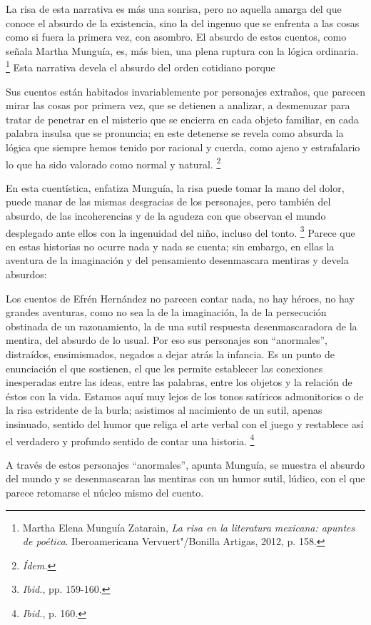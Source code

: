 \documentclass[14pt,twoside,final]{extbook} %
\let\oldfootnote\footnote
\renewcommand\footnote[1]{%
\oldfootnote{\hspace{1mm}#1}}
\begin{document}
La risa de esta narrativa es más una sonrisa, pero no aquella amarga del que conoce el absurdo de la existencia, sino la del ingenuo que se enfrenta a las cosas como si fuera la primera vez, con asombro. El absurdo de estos cuentos, como señala Martha Munguía, es, más bien, una plena ruptura con la lógica ordinaria.\footnote{Martha Elena Munguía Zatarain, \emph{La risa en la literatura mexicana: apuntes de poética}. Iberoamericana Vervuert"/Bonilla Artigas, 2012, p. 158.} Esta narrativa devela el absurdo del orden cotidiano porque
\begin{quoting}
Sus cuentos están habitados invariablemente por personajes extraños, que parecen mirar las cosas por primera vez, que se detienen a analizar, a desmenuzar para tratar de penetrar en el misterio que se encierra en cada objeto familiar, en cada palabra insulsa que se pronuncia; en este detenerse se revela como absurda la lógica que siempre hemos tenido por racional y cuerda, como ajeno y estrafalario lo que ha sido valorado como normal y natural.\footnote{\em Ídem.}
\end{quoting}
En esta cuentística, enfatiza Munguía, la risa puede tomar la mano del dolor, puede manar de las mismas desgracias de los personajes, pero también del absurdo, de las incoherencias y de la agudeza con que observan el mundo desplegado ante ellos con la ingenuidad del niño, incluso del tonto.\footnote{\emph{Ibid.}, pp. 159-160.} Parece que en estas historias no ocurre nada y nada se cuenta; sin embargo, en ellas la aventura de la imaginación y del pensamiento desenmascara mentiras y devela absurdos:
\begin{quoting}
Los cuentos de Efrén Hernández no parecen contar nada, no hay héroes, no hay grandes aventuras, como no sea la de la imaginación, la de la persecución obstinada de un razonamiento, la de una sutil respuesta desenmascaradora de la mentira, del absurdo de lo usual. Por eso sus personajes son ``anormales'', distraídos, ensimismados, negados a dejar atrás la infancia. Es un punto de enunciación el que sostienen, el que les permite establecer las conexiones inesperadas entre las ideas, entre las palabras, entre los objetos y la relación de éstos con la vida. Estamos aquí muy lejos de los tonos satíricos admonitorios o de la risa estridente de la burla; asistimos al nacimiento de un sutil, apenas insinuado, sentido del humor que religa el arte verbal con el juego y restablece así el verdadero y profundo sentido de contar una historia.\footnote{\emph{Ibid.}, p. 160.}
\end{quoting}
A través de estos personajes ``anormales'', apunta Munguía, se muestra el absurdo del mundo y se desenmascaran las mentiras con un humor sutil, lúdico, con el que parece retomarse el núcleo mismo del cuento.
\end{document}
